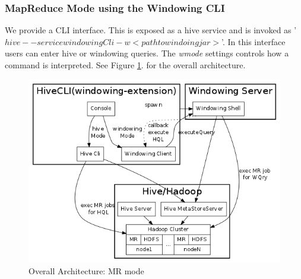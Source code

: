 \documentclass[pdftex,10pt,a4paper]{article}
\begin{document}
\subsubsection{MapReduce Mode using the Windowing CLI}
We provide a CLI interface. This is exposed as a hive service and is
invoked as '$hive --service windowingCli -w <path to windoing jar>$'. In
this interface users can enter hive or windowing queries. The {\em
  wmode} settings controls how a command is interpreted. See Figure \ref{mrarch}.
for the overall architecture.
\begin{figure}[h]
\centering
    \includegraphics[scale=0.5]{mrarch.png}
\caption{Overall Architecture: MR mode}
\label{mrarch}
  \end{figure}
\end{document}
